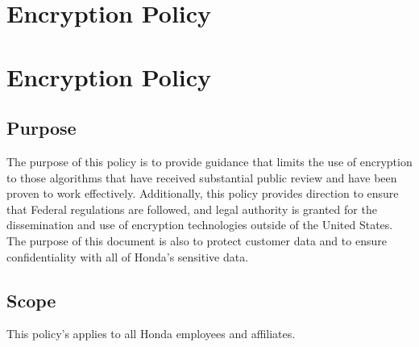 \chapter{Encryption Policy}
\pagestyle{fancy}

\fancyhf{}

\fancyfoot[C]{\thepage}

\renewcommand{\headrulewidth}{0pt}
\renewcommand{\footrulewidth}{0pt}

\chapter{Encryption Policy}

\section{Purpose}

The purpose of this policy is to provide guidance that limits the use of encryption
to those algorithms that have received substantial public review and have been
proven to work effectively. Additionally, this policy provides direction to ensure
that Federal regulations are followed, and legal authority is granted for the
dissemination and use of encryption technologies outside of the United States.
The purpose of this document is also to protect customer data and to ensure
confidentiality with all of Honda’s sensitive data.



\section{Scope}
This policy’s applies to all Honda employees and affiliates.


